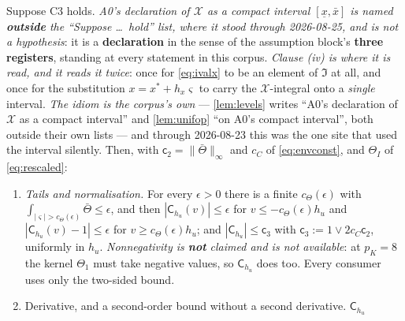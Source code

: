 \begin{lemma}\label{lem:intker}
Suppose C3 holds. \emph{A0's declaration of $\mathcal X$ as a compact interval $[\underline x,\bar x]$
is named \textbf{outside} the ``Suppose \dots\ hold'' list, where it stood through 2026-08-25, and is
not a hypothesis}: it is a \textbf{declaration} in the sense of the assumption block's \textbf{three
registers}, standing at every statement in this corpus. \emph{Clause \textup{(iv)} is where it is read,
and it reads it twice}: once for
\eqref{eq:ivalx} to be an element of $\mathfrak I$ at all, and once for the substitution
$x=x^\ast+h_x\varsigma$ to carry the $\mathcal X$-integral onto a \emph{single} interval.
\emph{The idiom is the corpus's own} --- \cref{lem:levels} writes ``A0's declaration of $\mathcal X$
as a compact interval'' and \cref{lem:unifop} ``on A0's compact interval'', both outside their own
lists --- and through 2026-08-23
this was the one site that used the interval silently. Then, with $\mathsf c_2=\|\bar\Theta\|_\infty$ and $c_C$ of \eqref{eq:envconst},
and $\Theta_{I}$ of \eqref{eq:rescaled}:
\begin{enumerate}
\item[(i)] \emph{Tails and normalisation.} For every $\epsilon>0$ there is a finite
$c_\Theta(\epsilon)$ with $\int_{|\varsigma|>c_\Theta(\epsilon)}\bar\Theta\le\epsilon$, and then
$|\mathsf C_{h_u}(v)|\le\epsilon$ for $v\le-c_\Theta(\epsilon)h_u$ and
$|\mathsf C_{h_u}(v)-1|\le\epsilon$ for $v\ge c_\Theta(\epsilon)h_u$; and
$|\mathsf C_{h_u}|\le\mathsf c_3$ with
$\mathsf c_3:=1\vee 2c_C\mathsf c_2$, uniformly in $h_u$. \emph{Nonnegativity is \textbf{not} claimed
and is not available}: at $p_K=8$ the kernel $\Theta_1$ must take negative values, so
$\mathsf C_{h_u}$ does too. Every consumer uses only the two-sided bound.
\item[(ii)] Derivative, and a second-order bound without a second derivative. $\mathsf C_{h_u}$

\end{enumerate}
\end{lemma}
